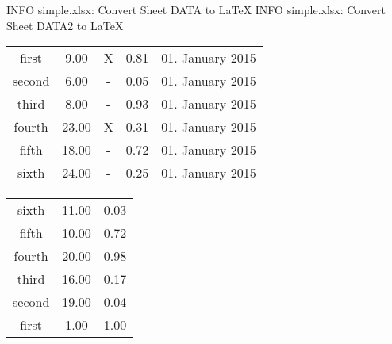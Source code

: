  INFO simple.xlsx: Convert Sheet DATA to LaTeX
 INFO simple.xlsx: Convert Sheet DATA2 to LaTeX
%
%


%
%
\begin{tabular}{c|c|c|c|c|}
first & 9.00 & X & 0.81 & 01. January 2015\\
second & 6.00 & - & 0.05 & 01. January 2015\\
third & 8.00 & - & 0.93 & 01. January 2015\\
fourth & 23.00 & X & 0.31 & 01. January 2015\\
fifth & 18.00 & - & 0.72 & 01. January 2015\\
sixth & 24.00 & - & 0.25 & 01. January 2015
\end{tabular}

%
%
\begin{tabular}{c|c|c|}
sixth & 11.00 & 0.03\\
fifth & 10.00 & 0.72\\
fourth & 20.00 & 0.98\\
third & 16.00 & 0.17\\
second & 19.00 & 0.04\\
first & 1.00 & 1.00
\end{tabular}
